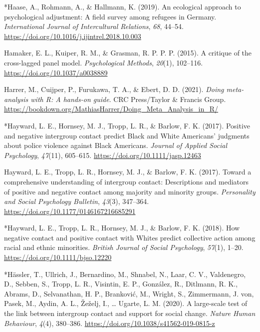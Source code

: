 \documentclass[12pt, letterpaper]{article}
\newenvironment{CSLReferences}[2]{}{}
\begin{document}
\begin{CSLReferences}{1}{0}
\leavevmode\hypertarget{ref-1949}{}%
*Haase, A., Rohmann, A., \& Hallmann, K. (2019). An ecological approach
to psychological adjustment: {A} field survey among refugees in
{Germany}. \emph{International Journal of Intercultural Relations},
\emph{68}, 44--54. \url{https://doi.org/10.1016/j.ijintrel.2018.10.003}

\leavevmode\hypertarget{ref-hamaker_critique_2015}{}%
Hamaker, E. L., Kuiper, R. M., \& Grasman, R. P. P. P. (2015). A
critique of the cross-lagged panel model. \emph{Psychological Methods},
\emph{20}(1), 102--116. \url{https://doi.org/10.1037/a0038889}

\leavevmode\hypertarget{ref-harrer_doing_2021}{}%
Harrer, M., Cuijper, P., Furukawa, T. A., \& Ebert, D. D. (2021).
\emph{Doing meta-analysis with {R}: A hands-on guide}. CRC Press/Taylor
\& Francis Group.
\url{https://bookdown.org/MathiasHarrer/Doing_Meta_Analysis_in_R/}

\leavevmode\hypertarget{ref-4003}{}%
*Hayward, L. E., Hornsey, M. J., Tropp, L. R., \& Barlow, F. K. (2017).
Positive and negative intergroup contact predict {Black} and {White}
{Americans}' judgments about police violence against {Black}
{Americans}. \emph{Journal of Applied Social Psychology}, \emph{47}(11),
605--615. \url{https://doi.org/10.1111/jasp.12463}

\leavevmode\hypertarget{ref-hayward_toward_2017}{}%
Hayward, L. E., Tropp, L. R., Hornsey, M. J., \& Barlow, F. K. (2017).
Toward a comprehensive understanding of intergroup contact: Descriptions
and mediators of positive and negative contact among majority and
minority groups. \emph{Personality and Social Psychology Bulletin},
\emph{43}(3), 347--364. \url{https://doi.org/10.1177/0146167216685291}

\leavevmode\hypertarget{ref-2309}{}%
*Hayward, L. E., Tropp, L. R., Hornsey, M. J., \& Barlow, F. K. (2018).
How negative contact and positive contact with {Whites} predict
collective action among racial and ethnic minorities. \emph{British
Journal of Social Psychology}, \emph{57}(1), 1--20.
\url{https://doi.org/10.1111/bjso.12220}

\leavevmode\hypertarget{ref-3054}{}%
*Hässler, T., Ullrich, J., Bernardino, M., Shnabel, N., Laar, C. V.,
Valdenegro, D., Sebben, S., Tropp, L. R., Visintin, E. P., González, R.,
Ditlmann, R. K., Abrams, D., Selvanathan, H. P., Branković, M., Wright,
S., Zimmermann, J. von, Pasek, M., Aydin, A. L., Žeželj, I., \ldots{}
Ugarte, L. M. (2020). A large-scale test of the link between intergroup
contact and support for social change. \emph{Nature Human Behaviour},
\emph{4}(4), 380--386. \url{https://doi.org/10.1038/s41562-019-0815-z}


\end{CSLReferences}
\end{document}
